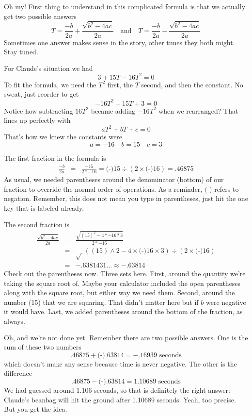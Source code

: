 Oh my!  First thing to understand in this complicated formula is that we actually get two possible answers $$T = \frac{-b}{2a}+ \frac{\sqrt{b^2-4ac}}{2a} \quad \text{and} \quad T = \frac{-b}{2a} - \frac{\sqrt{b^2-4ac}}{2a}$$
Sometimes one answer makes sense in the story, other times they both might.  Stay tuned.

For Claude's situation we had $$3+15T-16T^2=0$$  To fit the formula, we need the $T^2$ first, the $T$ second, and then the constant.  No sweat, just reorder to get
$$-16T^2 + 15T + 3=0$$ 
Notice how subtracting $16T^2$ became adding $-16T^2$ when we rearranged?
That lines up perfectly with $$aT^2+bT+c=0$$ That's how we knew the constants were  $$a = -16 \quad b = 15 \quad c = 3$$ 

The first fraction in the formula is   
 \begin{eqnarray*}
\frac{-b}{2a} & = & \frac{-15}{2\ast-16} =  \text{(-)}15 \div (2 \times \text{(-)}16) = .46875
\end{eqnarray*}
As usual, we needed parentheses around the denominator (bottom) of our fraction to override the normal order of operations.  As a reminder, $\text{(-)}$ refers to negation.  Remember, this does not mean you type in parentheses, just hit the one key that is labeled \text{(-)} already. 

The second fraction is \begin{eqnarray*}
\frac{\sqrt{b^2-4ac}}{2a} & = &   \frac{\sqrt{(15)^2-4 \ast -16 \ast 3}}{2 \ast-16}\\
& = &   \sqrt{~} ( (15) \wedge 2 - 4 \times  \text{(-)}16 \times 3) \div (2 \times  \text{(-)}16)\\
& =  & -.6381431\ldots \approx -.63814
\end{eqnarray*}
Check out the parentheses now.  Three sets here.  First, around the quantity we're taking the square root of.  Maybe your calculator included the open parentheses along with the square root, but either way we need them.    Second,  around the number (15) that we are squaring.  That didn't matter here but if $b$ were negative it would have. Last, we added parentheses around the bottom of the fraction, as always.

Oh, and we're not done yet.  Remember there are two possible answers.  One is the sum of these two numbers 
$$ .46875 +  \text{(-)}.63814 = -.16939 \text{ seconds}$$ 
which doesn't make any sense because time is never negative.  The other is the difference
$$.46875 -  \text{(-)}.63814 = 1.10689 \text{ seconds}$$  
We had guessed around 1.106 seconds, so that is definitely the right answer:  Claude's beanbag will hit the ground after 1.10689 seconds.  Yeah, too precise.  But you get the idea.

